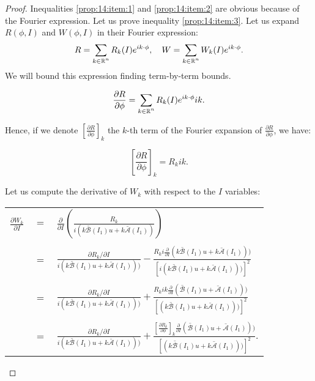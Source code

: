 \begin{proof}
Inequalities \ref{prop:14:item:1} and \ref{prop:14:item:2} are obvious because of the Fourier expression.
Let us prove inequality \ref{prop:14:item:3}. Let us expand $R(\phi,I)$ and $W(\phi, I)$ in their Fourier expression:
$$R = \sum_{\begin{subarray}{c} k\in\mathbb{R}^n\end{subarray}} R_k(I)e^{ik\cdot\phi}, \quad W = \sum_{\begin{subarray}{c} k\in\mathbb{R}^n \end{subarray}} W_k(I)e^{ik\cdot\phi}.$$
We will bound this expression finding  term-by-term bounds.

$$\frac{\partial R}{\partial \phi} = \sum_{\begin{subarray}{c} k\in\mathbb{R}^n\end{subarray}} R_k(I)e^{ik\cdot\phi}ik.$$

Hence, if we denote  $[ \frac{\partial R}{\partial \phi} ]_k $ the $k$-th term of the Fourier expansion of $\frac{\partial R}{\partial \phi}$, we have:

$$\left[ \frac{\partial R}{\partial \phi} \right]_k = R_k ik.$$

Let us compute the derivative of $W_k$ with respect to the $I$ variables:

\begin{longtable}{rcl}
$\displaystyle \frac{\partial W_k}{\partial I}$ & $=$ & $\displaystyle\frac{\partial}{\partial I}\left(\frac{R_k}{i(k \bar{\mathcal{B}}(I_1) u  + k \bar{\mathcal{A}}(I_1))}\right)$\\
\\
& $=$ & $\displaystyle \frac{\partial R_k/\partial I }{i(k \bar{\mathcal{B}}(I_1) u  + k \bar{\mathcal{A}}(I_1)))} - \frac{R_k i \frac{\partial}{\partial I }(k \bar{\mathcal{B}}(I_1) u  + k \bar{\mathcal{A}}(I_1)))}{[i(k \bar{\mathcal{B}}(I_1) u  + k \bar{\mathcal{A}}(I_1)))]^2}$\\
\\
& $=$ & $\displaystyle \frac{\partial R_k/\partial I }{i(k \bar{\mathcal{B}}(I_1) u  + k \bar{\mathcal{A}}(I_1)))} + \frac{R_k i k \frac{\partial}{\partial I }(\bar{\mathcal{B}}(I_1) u  + \bar{\mathcal{A}}(I_1)))}{[(k \bar{\mathcal{B}}(I_1) u  + k \bar{\mathcal{A}}(I_1)))]^2}$\\
\\
& $=$ & $\displaystyle \frac{\partial R_k/\partial I }{i(k \bar{\mathcal{B}}(I_1) u  + k \bar{\mathcal{A}}(I_1)))} + \frac{[\frac{\partial R_k}{\partial \phi}]_k \frac{\partial}{\partial I }(\bar{\mathcal{B}}(I_1) u  + \bar{\mathcal{A}}(I_1)))}{[(k \bar{\mathcal{B}}(I_1) u  + k \bar{\mathcal{A}}(I_1)))]^2}.$\\
\end{longtable}



\end{proof}

